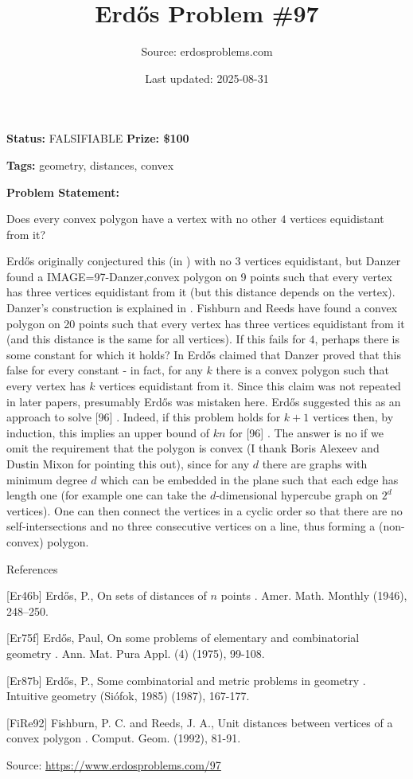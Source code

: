 \documentclass{article}
\title{Erd\H{o}s Problem \#97}
\date{Last updated: 2025-08-31}
\author{Source: erdosproblems.com}
\begin{document}
\maketitle

\noindent\textbf{Status:} FALSIFIABLE \quad \textbf{Prize: \$100}

\noindent\textbf{Tags:} geometry, distances, convex

\medskip

\noindent\textbf{Problem Statement:}

Does every convex polygon have a vertex with no other $4$ vertices equidistant from it?




Erd\H{o}s originally conjectured this (in \cite{Er46b}) with no $3$ vertices equidistant, but Danzer found a {IMAGE=97-Danzer,convex polygon} on 9 points such that every vertex has three vertices equidistant from it (but this distance depends on the vertex). Danzer's construction is explained in \cite{Er87b}. Fishburn and Reeds \cite{FiRe92} have found a convex polygon on 20 points such that every vertex has three vertices equidistant from it (and this distance is the same for all vertices). If this fails for $4$, perhaps there is some constant for which it holds? In \cite{Er75f} Erd\H{o}s claimed that Danzer proved that this false for every constant - in fact, for any $k$ there is a convex polygon such that every vertex has $k$ vertices equidistant from it. Since this claim was not repeated in later papers, presumably Erd\H{o}s was mistaken here. Erd\H{o}s suggested this as an approach to solve [96] . Indeed, if this problem holds for $k+1$ vertices then, by induction, this implies an upper bound of $kn$ for [96] . The answer is no if we omit the requirement that the polygon is convex (I thank Boris Alexeev and Dustin Mixon for pointing this out), since for any $d$ there are graphs with minimum degree $d$ which can be embedded in the plane such that each edge has length one (for example one can take the $d$-dimensional hypercube graph on $2^d$ vertices). One can then connect the vertices in a cyclic order so that there are no self-intersections and no three consecutive vertices on a line, thus forming a (non-convex) polygon.




References

[Er46b] Erd\H{o}s, P., On sets of distances of {$n$} points . Amer. Math. Monthly (1946), 248--250.

[Er75f] Erd\H{o}s, Paul, On some problems of elementary and combinatorial geometry . Ann. Mat. Pura Appl. (4) (1975), 99-108.

[Er87b] Erd\H{o}s, P., Some combinatorial and metric problems in geometry . Intuitive geometry (Si\'{o}fok, 1985) (1987), 167-177.

[FiRe92] Fishburn, P. C. and Reeds, J. A., Unit distances between vertices of a convex polygon . Comput. Geom. (1992), 81-91.

\bigskip
\noindent\small{Source: \url{https://www.erdosproblems.com/97}}
\end{document}
